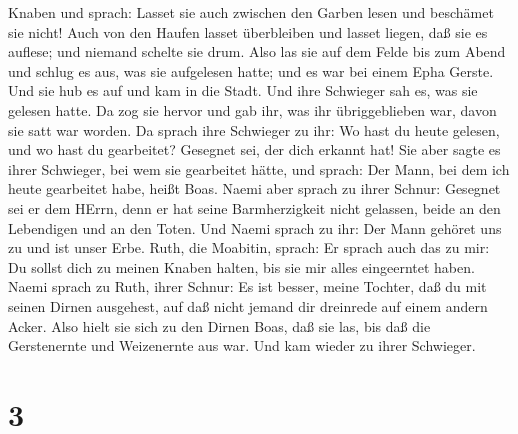 Knaben und sprach: Lasset sie auch zwischen den Garben lesen und
beschämet sie nicht!  Auch von den Haufen lasset
überbleiben und lasset liegen, daß sie es auflese; und niemand schelte
sie drum.  Also las sie auf dem Felde bis zum Abend und
schlug es aus, was sie aufgelesen hatte; und es war bei einem Epha
Gerste.  Und sie hub es auf und kam in die Stadt. Und ihre
Schwieger sah es, was sie gelesen hatte. Da zog sie hervor und gab ihr,
was ihr übriggeblieben war, davon sie satt war worden.  Da
sprach ihre Schwieger zu ihr: Wo hast du heute gelesen, und wo hast du
gearbeitet? Gesegnet sei, der dich erkannt hat! Sie aber sagte es ihrer
Schwieger, bei wem sie gearbeitet hätte, und sprach: Der Mann, bei dem
ich heute gearbeitet habe, heißt Boas.  Naemi aber sprach
zu ihrer Schnur: Gesegnet sei er dem HErrn, denn er hat seine
Barmherzigkeit nicht gelassen, beide an den Lebendigen und an den Toten.
Und Naemi sprach zu ihr: Der Mann gehöret uns zu und ist unser Erbe.
 Ruth, die Moabitin, sprach: Er sprach auch das zu mir: Du
sollst dich zu meinen Knaben halten, bis sie mir alles eingeerntet
haben.  Naemi sprach zu Ruth, ihrer Schnur: Es ist besser,
meine Tochter, daß du mit seinen Dirnen ausgehest, auf daß nicht jemand
dir dreinrede auf einem andern Acker.  Also hielt sie sich
zu den Dirnen Boas, daß sie las, bis daß die Gerstenernte und
Weizenernte aus war. Und kam wieder zu ihrer Schwieger.

\hypertarget{section-2}{%
\section{3}\label{section-2}}

